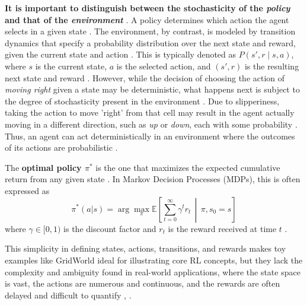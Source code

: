 \documentclass[final]{anthology-ch}         %
\begin{document}
\textbf{It is important to distinguish between the stochasticity of the \textit{policy} and that of the \textit{environment}} \cite{Sutton1998}. A policy determines which action the agent selects in a given state \cite{Sutton1998, russell2016artificial}. The environment, by contrast, is modeled by transition dynamics that specify a probability distribution over the next state and reward, given the current state and action \cite{puterman2014markov}. This is typically denoted as \( P(s', r \mid s, a) \), where \( s \) is the current state, \( a \) is the selected action, and \( (s', r) \) is the resulting next state and reward \cite{Sutton1998, puterman2014markov}. However, while the decision of choosing the action of \textit{moving right} given a state may be deterministic, what happens next is subject to the degree of stochasticity present in the environment \cite{Sutton1998, FrozenLakeGymnasium2023}. Due to slipperiness, taking the action to move  'right' from that cell may result in the agent actually moving in a different direction, such as \textit{up} or \textit{down}, each with some probability \cite{frozenlake}. Thus, an agent can act deterministically in an environment where the outcomes of its actions are probabilistic \cite{Sutton1998, kaelbling1996reinforcement}.

The \textbf{optimal policy $\pi^*$} is the one that maximizes the expected cumulative return from any given state \cite{Sutton1998, puterman2014markov}. In Markov Decision Processes (MDPs), this is often expressed as 
\begin{equation}
\pi^*(a|s) = \arg\max_{\pi} \mathbb{E} \left[ \sum_{t=0}^{\infty} \gamma^t r_t \,\middle|\, \pi, s_0 = s \right]
\end{equation}
where $\gamma \in [0,1)$ is the discount factor and $r_t$ is the reward received at time $t$ \cite{puterman2014markov, Sutton1998}.

This simplicity in defining states, actions, transitions, and rewards makes toy examples like GridWorld ideal for illustrating core RL concepts, but they lack the complexity and ambiguity found in real-world applications, where the state space is vast, the actions are numerous and continuous, and the rewards are often delayed and difficult to quantify \cite{dulac2021challenges, levine2020offline}, .
\end{document}
